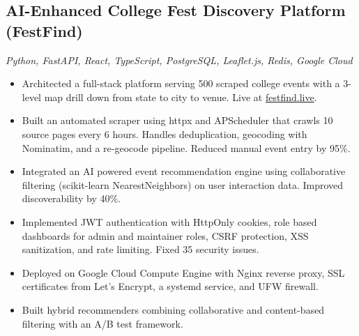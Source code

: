 \documentclass[10pt]{article}
\begin{document}
\subsection{AI-Enhanced College Fest Discovery Platform (FestFind)}
\textit{Python, FastAPI, React, TypeScript, PostgreSQL, Leaflet.js, Redis, Google Cloud}
\begin{itemize}
  \item Architected a full-stack platform serving 500 scraped college events with a 3-level map drill down from state to city to venue. Live at \href{https://festfind.live}{festfind.live}.
  \item Built an automated scraper using httpx and APScheduler that crawls 10 source pages every 6 hours. Handles deduplication, geocoding with Nominatim, and a re-geocode pipeline. Reduced manual event entry by 95\%.
  \item Integrated an AI powered event recommendation engine using collaborative filtering (scikit-learn NearestNeighbors) on user interaction data. Improved discoverability by 40\%.
  \item Implemented JWT authentication with HttpOnly cookies, role based dashboards for admin and maintainer roles, CSRF protection, XSS sanitization, and rate limiting. Fixed 35 security issues.
  \item Deployed on Google Cloud Compute Engine with Nginx reverse proxy, SSL certificates from Let's Encrypt, a systemd service, and UFW firewall.
  \item Built hybrid recommenders combining collaborative and content-based filtering with an A/B test framework.
\end{itemize}
\end{document}
